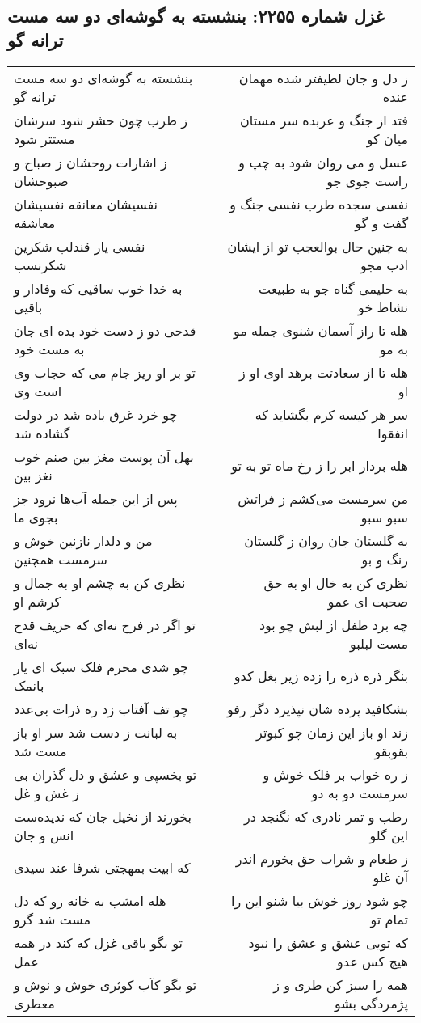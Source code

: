 \begin{center}
\section*{غزل شماره ۲۲۵۵: بنشسته به گوشه‌ای دو سه مست ترانه گو}
\label{sec:2255}
\begin{longtable}{l p{0.5cm} r}
بنشسته به گوشه‌ای دو سه مست ترانه گو
&&
ز دل و جان لطیفتر شده مهمان عنده
\\
ز طرب چون حشر شود سرشان مستتر شود
&&
فتد از جنگ و عربده سر مستان میان کو
\\
ز اشارات روحشان ز صباح و صبوحشان
&&
عسل و می روان شود به چپ و راست جوی جو
\\
نفسیشان معانقه نفسیشان معاشقه
&&
نفسی سجده طرب نفسی جنگ و گفت و گو
\\
نفسی یار قندلب شکرین شکرنسب
&&
به چنین حال بوالعجب تو از ایشان ادب مجو
\\
به خدا خوب ساقیی که وفادار و باقیی
&&
به حلیمی گناه جو به طبیعت نشاط خو
\\
قدحی دو ز دست خود بده ای جان به مست خود
&&
هله تا راز آسمان شنوی جمله مو به مو
\\
تو بر او ریز جام می که حجاب وی است وی
&&
هله تا از سعادتت برهد اوی او ز او
\\
چو خرد غرق باده شد در دولت گشاده شد
&&
سر هر کیسه کرم بگشاید که انفقوا
\\
بهل آن پوست مغز بین صنم خوب نغز بین
&&
هله بردار ابر را ز رخ ماه تو به تو
\\
پس از این جمله آب‌ها نرود جز بجوی ما
&&
من سرمست می‌کشم ز فراتش سبو سبو
\\
من و دلدار نازنین خوش و سرمست همچنین
&&
به گلستان جان روان ز گلستان رنگ و بو
\\
نظری کن به چشم او به جمال و کرشم او
&&
نظری کن به خال او به حق صحبت ای عمو
\\
تو اگر در فرح نه‌ای که حریف قدح نه‌ای
&&
چه برد طفل از لبش چو بود مست لبلبو
\\
چو شدی محرم فلک سبک ای یار بانمک
&&
بنگر ذره ذره را زده زیر بغل کدو
\\
چو تف آفتاب زد ره ذرات بی‌عدد
&&
بشکافید پرده شان نپذیرد دگر رفو
\\
به لبانت ز دست شد سر او باز مست شد
&&
زند او باز این زمان چو کبوتر بقوبقو
\\
تو بخسپی و عشق و دل گذران بی ز غش و غل
&&
ز ره خواب بر فلک خوش و سرمست دو به دو
\\
بخورند از نخیل جان که ندیده‌ست انس و جان
&&
رطب و تمر نادری که نگنجد در این گلو
\\
که ابیت بمهجتی شرفا عند سیدی
&&
ز طعام و شراب حق بخورم اندر آن غلو
\\
هله امشب به خانه رو که دل مست شد گرو
&&
چو شود روز خوش بیا شنو این را تمام تو
\\
تو بگو باقی غزل که کند در همه عمل
&&
که تویی عشق و عشق را نبود هیچ کس عدو
\\
تو بگو کآب کوثری خوش و نوش و معطری
&&
همه را سبز کن طری و ز پژمردگی بشو
\\
\end{longtable}
\end{center}

